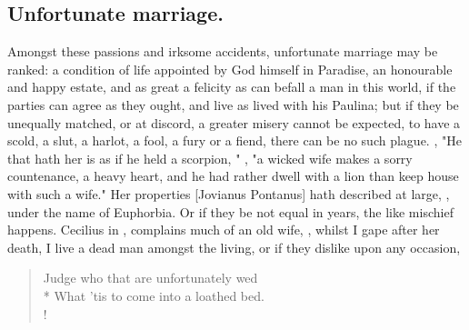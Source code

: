 
\subsection{Unfortunate marriage.}

Amongst these passions and irksome accidents, unfortunate marriage may be
ranked: a condition of life appointed by God himself in Paradise, an honourable
and happy estate, and as great a felicity as can befall a man in this world,
if the parties can agree as they ought, and live as
\Seneca{} lived with his Paulina; but if they be unequally
matched, or at discord, a greater misery cannot be expected, to have a scold, a
slut, a harlot, a fool, a fury or a fiend, there can be no such plague.
, "He that hath her is as if he held a scorpion,
\etc{}" , "a wicked wife makes a sorry countenance, a heavy
heart, and he had rather dwell with a lion than keep house with such a wife."
Her properties [Jovianus Pontanus] hath described at large,
, under the name of Euphorbia. Or if
they be not equal in years, the like mischief happens. Cecilius in
, complains much of an old wife,
, whilst I gape after
her death, I live a dead man amongst the living, or if they dislike upon any
occasion,

\begin{verse}%
Judge who that are unfortunately wed\\*
What 'tis to come into a loathed bed.\\!
\end{verse}%


